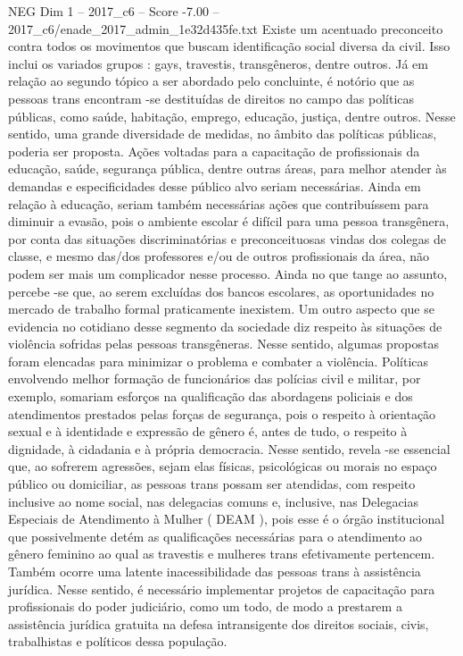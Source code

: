\begin{textsample}{NEG Dim 1 – 2017\_c6 – Score -7.00 – 2017\_c6/enade\_2017\_admin\_1e32d435fe.txt}
Existe um acentuado preconceito contra todos os movimentos que buscam identificação social diversa da civil.
Isso inclui os variados grupos : gays, travestis, transgêneros, dentre outros.
Já em relação ao segundo tópico a ser abordado pelo concluinte, é notório que as pessoas trans encontram -se destituídas de direitos no campo das políticas públicas, como saúde, habitação, emprego, educação, justiça, dentre outros.
Nesse sentido, uma grande diversidade de medidas, no âmbito das políticas públicas, poderia ser proposta.
Ações voltadas para a capacitação de profissionais da educação, saúde, segurança pública, dentre outras áreas, para melhor atender às demandas e especificidades desse público alvo seriam necessárias.
Ainda em relação à educação, seriam também necessárias ações que contribuíssem para diminuir a evasão, pois o ambiente escolar é difícil para uma pessoa transgênera, por conta das situações discriminatórias e preconceituosas vindas dos colegas de classe, e mesmo das/dos professores e/ou de outros profissionais da área, não podem ser mais um complicador nesse processo.
Ainda no que tange ao assunto, percebe -se que, ao serem excluídas dos bancos escolares, as oportunidades no mercado de trabalho formal praticamente inexistem.
Um outro aspecto que se evidencia no cotidiano desse segmento da sociedade diz respeito às situações de violência sofridas pelas pessoas transgêneras.
Nesse sentido, algumas propostas foram elencadas para minimizar o problema e combater a violência.
Políticas envolvendo melhor formação de funcionários das polícias civil e militar, por exemplo, somariam esforços na qualificação das abordagens policiais e dos atendimentos prestados pelas forças de segurança, pois o respeito à orientação sexual e à identidade e expressão de gênero é, antes de tudo, o respeito à dignidade, à cidadania e à própria democracia.
Nesse sentido, revela -se essencial que, ao sofrerem agressões, sejam elas físicas, psicológicas ou morais no espaço público ou domiciliar, as pessoas trans possam ser atendidas, com respeito inclusive ao nome social, nas delegacias comuns e, inclusive, nas Delegacias Especiais de Atendimento à Mulher ( DEAM ), pois esse é o órgão institucional que possivelmente detém as qualificações necessárias para o atendimento ao gênero feminino ao qual as travestis e mulheres trans efetivamente pertencem.
Também ocorre uma latente inacessibilidade das pessoas trans à assistência jurídica.
Nesse sentido, é necessário implementar projetos de capacitação para profissionais do poder judiciário, como um todo, de modo a prestarem a assistência jurídica gratuita na defesa intransigente dos direitos sociais, civis, trabalhistas e políticos dessa população.

\end{textsample}

